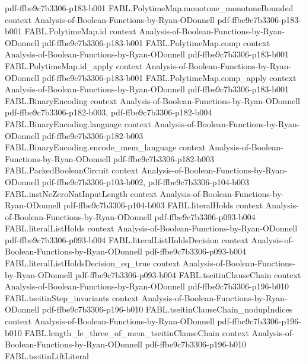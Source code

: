 \begin{theorem}
  {pdf-ffbe9c7b3306-p183-b001}
\proofstep
  {FABL.PolytimeMap.monotone_monotoneBounded}
  {context}
  {Analysis-of-Boolean-Functions-by-Ryan-ODonnell}
  {pdf-ffbe9c7b3306-p183-b001}
\proofstep
  {FABL.PolytimeMap.id}
  {context}
  {Analysis-of-Boolean-Functions-by-Ryan-ODonnell}
  {pdf-ffbe9c7b3306-p183-b001}
\proofstep
  {FABL.PolytimeMap.comp}
  {context}
  {Analysis-of-Boolean-Functions-by-Ryan-ODonnell}
  {pdf-ffbe9c7b3306-p183-b001}
\proofstep
  {FABL.PolytimeMap.id_apply}
  {context}
  {Analysis-of-Boolean-Functions-by-Ryan-ODonnell}
  {pdf-ffbe9c7b3306-p183-b001}
\proofstep
  {FABL.PolytimeMap.comp_apply}
  {context}
  {Analysis-of-Boolean-Functions-by-Ryan-ODonnell}
  {pdf-ffbe9c7b3306-p183-b001}
\proofstep
  {FABL.BinaryEncoding}
  {context}
  {Analysis-of-Boolean-Functions-by-Ryan-ODonnell}
  {pdf-ffbe9c7b3306-p182-b003,
    pdf-ffbe9c7b3306-p182-b004}
\proofstep
  {FABL.BinaryEncoding.language}
  {context}
  {Analysis-of-Boolean-Functions-by-Ryan-ODonnell}
  {pdf-ffbe9c7b3306-p182-b003}
\proofstep
  {FABL.BinaryEncoding.encode_mem_language}
  {context}
  {Analysis-of-Boolean-Functions-by-Ryan-ODonnell}
  {pdf-ffbe9c7b3306-p182-b003}
\proofstep
  {FABL.PackedBooleanCircuit}
  {context}
  {Analysis-of-Boolean-Functions-by-Ryan-ODonnell}
  {pdf-ffbe9c7b3306-p103-b002,
    pdf-ffbe9c7b3306-p104-b003}
\proofstep
  {FABL.instNeZeroNatInputLength}
  {context}
  {Analysis-of-Boolean-Functions-by-Ryan-ODonnell}
  {pdf-ffbe9c7b3306-p104-b003}
\proofstep
  {FABL.literalHolds}
  {context}
  {Analysis-of-Boolean-Functions-by-Ryan-ODonnell}
  {pdf-ffbe9c7b3306-p093-b004}
\proofstep
  {FABL.literalListHolds}
  {context}
  {Analysis-of-Boolean-Functions-by-Ryan-ODonnell}
  {pdf-ffbe9c7b3306-p093-b004}
\proofstep
  {FABL.literalListHoldsDecision}
  {context}
  {Analysis-of-Boolean-Functions-by-Ryan-ODonnell}
  {pdf-ffbe9c7b3306-p093-b004}
\proofstep
  {FABL.literalListHoldsDecision_eq_true}
  {context}
  {Analysis-of-Boolean-Functions-by-Ryan-ODonnell}
  {pdf-ffbe9c7b3306-p093-b004}
\proofstep
  {FABL.tseitinClauseChain}
  {context}
  {Analysis-of-Boolean-Functions-by-Ryan-ODonnell}
  {pdf-ffbe9c7b3306-p196-b010}
\proofstep
  {FABL.tseitinStep_invariants}
  {context}
  {Analysis-of-Boolean-Functions-by-Ryan-ODonnell}
  {pdf-ffbe9c7b3306-p196-b010}
\proofstep
  {FABL.tseitinClauseChain_nodupIndices}
  {context}
  {Analysis-of-Boolean-Functions-by-Ryan-ODonnell}
  {pdf-ffbe9c7b3306-p196-b010}
\proofstep
  {FABL.length_le_three_of_mem_tseitinClauseChain}
  {context}
  {Analysis-of-Boolean-Functions-by-Ryan-ODonnell}
  {pdf-ffbe9c7b3306-p196-b010}
\proofstep
  {FABL.tseitinLiftLiteral}

\end{theorem}
